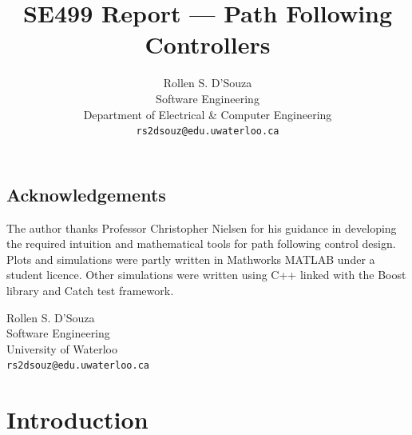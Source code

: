 \documentclass[oneside, 11pt]{book}
\author{{Rollen S. D'Souza}\\
        {Software Engineering}\\
        {Department of Electrical \& Computer Engineering}\\
        {\texttt{rs2dsouz@edu.uwaterloo.ca}}}
\title{\textbf{SE499 Report --- Path Following Controllers}}
\date{}
\begin{document}
\maketitle

\frontmatter
\section*{Acknowledgements}
The author thanks Professor Christopher Nielsen for his guidance in developing the required intuition and mathematical tools for path following control design. Plots and simulations were partly written in Mathworks MATLAB under a student licence. Other simulations were written using C++ linked with the Boost library\cite{boost} and Catch test framework\cite{catch}.

\begin{flushright}
Rollen S. D'Souza\\
Software Engineering\\
University of Waterloo\\
\texttt{rs2dsouz@edu.uwaterloo.ca}
\end{flushright}

\tableofcontents

\printnomenclature[3cm]
\listoffigures
\listoftables


\mainmatter
\pagestyle{fancy}
\renewcommand{\sectionmark}[1]{\markright{\thesection.\ #1}}

\chapter{Introduction}
\end{document}
